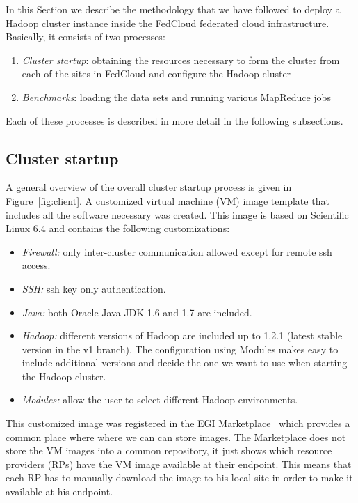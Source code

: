 In this Section we describe the methodology that we have followed to deploy a Hadoop cluster instance inside the FedCloud federated cloud infrastructure. Basically, it consists of two processes: 
\begin{enumerate}
\item \emph{Cluster startup}: obtaining the resources necessary to form the cluster from each of the sites in FedCloud and configure the Hadoop cluster
\item \emph{Benchmarks}: loading the data sets and running various MapReduce jobs
\end{enumerate}
Each of these processes is described in more detail in the following subsections.

\subsection{Cluster startup}
\label{ssect-cluster}

A general overview of the overall cluster startup process is given in Figure~\ref{fig:client}.
A customized virtual machine (VM) image template that includes all the software necessary was created. This image is based on Scientific Linux 6.4 and contains the following customizations:
\begin{itemize}
\item \emph{Firewall:} only inter-cluster communication allowed except for remote ssh access.
\item \emph{SSH:} ssh key only authentication.
\item \emph{Java:} both Oracle Java JDK 1.6 and 1.7 are included.
\item \emph{Hadoop:} different versions of Hadoop are included up to 1.2.1 (latest stable version in the v1 branch). The configuration using Modules makes easy to include additional versions and decide the one we want to use when starting the Hadoop cluster.
\item \emph{Modules:} allow the user to select different Hadoop environments.
\end{itemize}

This customized image was registered in the EGI Marketplace~\cite{marketplace} which provides a common place where where we can can store images. The Marketplace does not store the VM images into a common repository, it just shows which resource providers (RPs) have the VM image available at their endpoint. This means that each RP has to manually download the image to his local site in order to make it available at his endpoint. 

